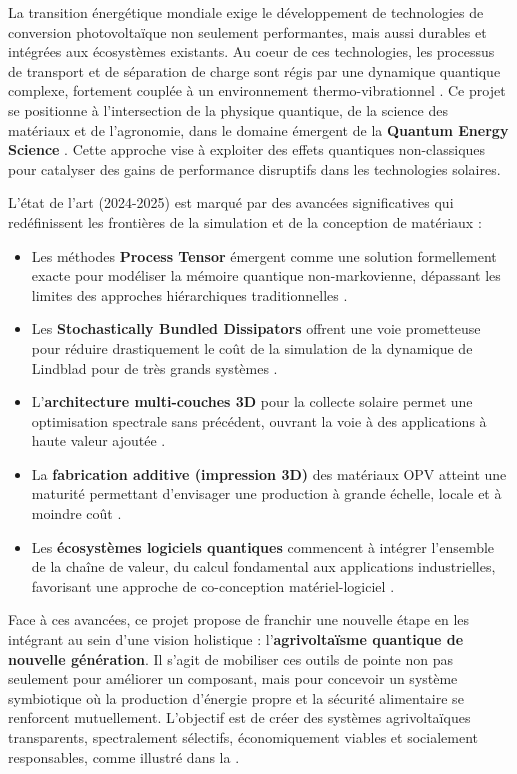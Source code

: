 \documentclass[12pt, a4paper]{article}
\begin{document}
La transition énergétique mondiale exige le développement de technologies de conversion photovoltaïque non seulement performantes, mais aussi durables et intégrées aux écosystèmes existants. Au coeur de ces technologies, les processus de transport et de séparation de charge sont régis par une dynamique quantique complexe, fortement couplée à un environnement thermo-vibrationnel \cite{ye2012, mohs2008}. Ce projet se positionne à l'intersection de la physique quantique, de la science des matériaux et de l'agronomie, dans le domaine émergent de la \textbf{Quantum Energy Science} \cite{Metzler2023}. Cette approche vise à exploiter des effets quantiques non-classiques pour catalyser des gains de performance disruptifs dans les technologies solaires.

L'état de l'art (2024-2025) est marqué par des avancées significatives qui redéfinissent les frontières de la simulation et de la conception de matériaux :
\begin{itemize}
  \item Les méthodes \textbf{Process Tensor} émergent comme une solution formellement exacte pour modéliser la mémoire quantique non-markovienne, dépassant les limites des approches hiérarchiques traditionnelles \cite{keeling2025}.

  \item Les \textbf{Stochastically Bundled Dissipators} offrent une voie prometteuse pour réduire drastiquement le coût de la simulation de la dynamique de Lindblad pour de très grands systèmes \cite{Adhikari2025}.

  \item L'\textbf{architecture multi-couches 3D} pour la collecte solaire permet une optimisation spectrale sans précédent, ouvrant la voie à des applications à haute valeur ajoutée \cite{shi2025a}.

  \item La \textbf{fabrication additive (impression 3D)} des matériaux OPV atteint une maturité permettant d'envisager une production à grande échelle, locale et à moindre coût \cite{ju2025}.

  \item Les \textbf{écosystèmes logiciels quantiques} commencent à intégrer l'ensemble de la chaîne de valeur, du calcul fondamental aux applications industrielles, favorisant une approche de co-conception matériel-logiciel \cite{basermann2024}.
\end{itemize}

Face à ces avancées, ce projet propose de franchir une nouvelle étape en les intégrant au sein d'une vision holistique : l'\textbf{agrivoltaïsme quantique de nouvelle génération}. Il s'agit de mobiliser ces outils de pointe non pas seulement pour améliorer un composant, mais pour concevoir un système symbiotique où la production d'énergie propre et la sécurité alimentaire se renforcent mutuellement. L'objectif est de créer des systèmes agrivoltaïques transparents, spectralement sélectifs, économiquement viables et socialement responsables, comme illustré dans la .
\end{document}
